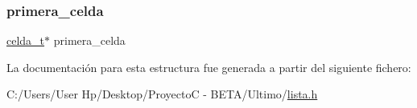 \subsubsection{\texorpdfstring{primera\+\_\+celda}{primera\_celda}}
{\footnotesize\ttfamily \hyperlink{lista_8h_a0a1091d8fab370e7a9537f180ea892db}{celda\+\_\+t}$\ast$ primera\+\_\+celda}



La documentación para esta estructura fue generada a partir del siguiente fichero\+:\begin{DoxyCompactItemize}
\item 
C\+:/\+Users/\+User Hp/\+Desktop/\+Proyecto\+C -\/ B\+E\+T\+A/\+Ultimo/\hyperlink{lista_8h}{lista.\+h}\end{DoxyCompactItemize}
